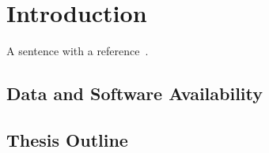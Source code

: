 \chapter{Introduction}
\label{chp:intro}

\lipsum[40-50]
A sentence with a reference~\cite{dahlberg_2022_netqasm}.


\section{Data and Software Availability}
\lipsum[51]


\section{Thesis Outline}
\lipsum[52]


\begin{xstretch}
\printbibliography[heading=subbibintoc,title={References},notcategory=noprint]
\end{xstretch}
